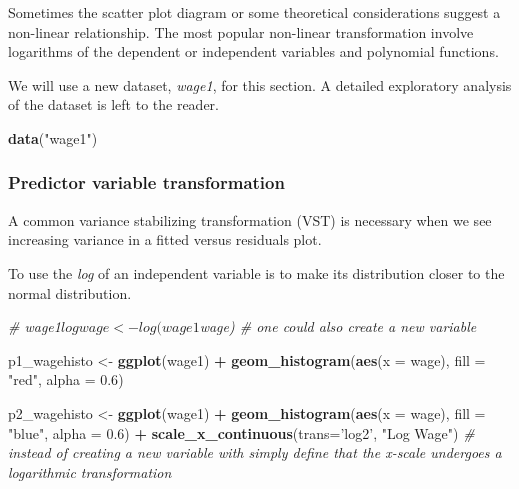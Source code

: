 \documentclass[]{book}
\newenvironment{Shaded}{\begin{snugshade}}{\end{snugshade}}
\newcommand{\CommentTok}[1]{\textcolor[rgb]{0.56,0.35,0.01}{\textit{#1}}}
\newcommand{\DataTypeTok}[1]{\textcolor[rgb]{0.13,0.29,0.53}{#1}}
\newcommand{\FloatTok}[1]{\textcolor[rgb]{0.00,0.00,0.81}{#1}}
\newcommand{\KeywordTok}[1]{\textcolor[rgb]{0.13,0.29,0.53}{\textbf{#1}}}
\newcommand{\NormalTok}[1]{#1}
\newcommand{\OperatorTok}[1]{\textcolor[rgb]{0.81,0.36,0.00}{\textbf{#1}}}
\newcommand{\StringTok}[1]{\textcolor[rgb]{0.31,0.60,0.02}{#1}}
\begin{document}
Sometimes the scatter plot diagram or some theoretical considerations
suggest a non-linear relationship. The most popular non-linear
transformation involve logarithms of the dependent or independent
variables and polynomial functions.

We will use a new dataset, \emph{wage1}, for this section. A detailed
exploratory analysis of the dataset is left to the reader.

\begin{Shaded}
\begin{Highlighting}[]
\KeywordTok{data}\NormalTok{(}\StringTok{"wage1"}\NormalTok{)}
\end{Highlighting}
\end{Shaded}

\hypertarget{predictor-variable-transformation}{%
\subsubsection{Predictor variable
transformation}\label{predictor-variable-transformation}}

A common variance stabilizing transformation (VST) is necessary when we
see increasing variance in a fitted versus residuals plot.

To use the \emph{log} of an independent variable is to make its
distribution closer to the normal distribution.

\begin{Shaded}
\begin{Highlighting}[]
\CommentTok{# wage1$logwage <- log(wage1$wage) # one could also create a new variable }

\NormalTok{p1_wagehisto <-}\StringTok{ }\KeywordTok{ggplot}\NormalTok{(wage1)  }\OperatorTok{+}
\StringTok{  }\KeywordTok{geom_histogram}\NormalTok{(}\KeywordTok{aes}\NormalTok{(}\DataTypeTok{x =}\NormalTok{ wage), }\DataTypeTok{fill =} \StringTok{"red"}\NormalTok{, }\DataTypeTok{alpha =} \FloatTok{0.6}\NormalTok{)}

\NormalTok{p2_wagehisto <-}\StringTok{ }\KeywordTok{ggplot}\NormalTok{(wage1)  }\OperatorTok{+}
\StringTok{  }\KeywordTok{geom_histogram}\NormalTok{(}\KeywordTok{aes}\NormalTok{(}\DataTypeTok{x =}\NormalTok{ wage),  }\DataTypeTok{fill =} \StringTok{"blue"}\NormalTok{, }\DataTypeTok{alpha =} \FloatTok{0.6}\NormalTok{) }\OperatorTok{+}
\StringTok{  }\KeywordTok{scale_x_continuous}\NormalTok{(}\DataTypeTok{trans=}\StringTok{'log2'}\NormalTok{, }\StringTok{"Log Wage"}\NormalTok{)  }\CommentTok{# instead of creating a new variable with simply define that the x-scale undergoes a logarithmic transformation}
\end{Highlighting}
\end{Shaded}
\end{document}
